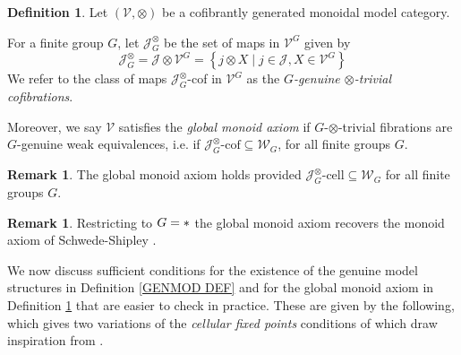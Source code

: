 \documentclass[a4paper,10pt
,draft
]{article}%
\numberwithin{equation}{section}
\numberwithin{figure}{section}
\theoremstyle{definition} %
\newtheorem{definition}[equation]{Definition}%
\newtheorem{remark}[equation]{Remark}%
\newcommand{\sets}[2]{\left\{ #1 \;|\; #2\right\}}%
\newcommand{\V}{\ensuremath{\mathcal V}}
\newcommand{\1}{\ensuremath{\mathbbm 1}}%
\begin{document}
\begin{definition}\label{GLOBMONAX_DEF}
	Let $(\V,\otimes)$ 
	be a cofibrantly generated monoidal model category.
		
	For a finite group $G$, let $\mathcal{J}^{\otimes}_G$ be the set of
	maps in $\V^G$ given by 
\[
\mathcal{J}^{\otimes}_G
=
\mathcal J \otimes \V^G
=
\sets{j \otimes X}{j \in \mathcal{J},X \in \V^G}
\]
We refer to the class of maps  
$\mathcal{J}^{\otimes}_G$-cof in $\V^G$
as the \emph{$G$-genuine $\otimes$-trivial cofibrations}.

Moreover, we say $\V$ satisfies the \textit{global monoid axiom} if
$G$-$\otimes$-trivial fibrations are $G$-genuine weak equivalences,
i.e. if $\mathcal J^{\otimes}_G \text{-cof} \subseteq \mathcal W_G$,
for all finite groups $G$.
\end{definition}



\begin{remark}
	The global monoid axiom holds provided
	$\mathcal J^{\otimes}_G \text{-cell} \subseteq \mathcal W_G$
	for all finite groups $G$.
\end{remark}


\begin{remark}\label{MONAX_REM}
	Restricting to $G = \**$ the global monoid axiom  
	recovers the monoid axiom of Schwede-Shipley \cite{SS00}.
\end{remark}



We now discuss sufficient conditions 
for the existence of the genuine model structures in 
Definition \ref{GENMOD DEF}
and for the global monoid axiom in 
Definition \ref{GLOBMONAX_DEF}
that are easier to check in practice.
These are given by the following,
which gives two variations of the 
\emph{cellular fixed points} conditions of
\cite[Prop. 2.6]{Ste16}
which draw inspiration from \cite[Remark 2.7]{Ste16}.
\end{document}
